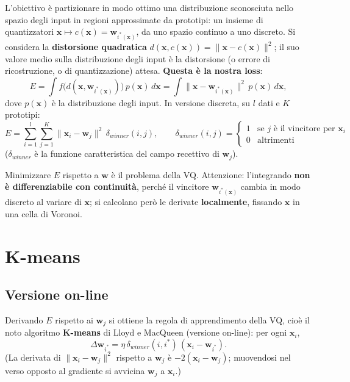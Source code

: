 L'obiettivo è partizionare in modo ottimo una distribuzione sconosciuta
nello spazio degli input in regioni approssimate da prototipi: un
insieme di quantizzatori
\(\mathbf{x} \mapsto c(\mathbf{x}) = \mathbf{w}_{i^*(\mathbf{x})}\), da
uno spazio continuo a uno discreto. Si considera la \textbf{distorsione
quadratica}
\(d(\mathbf{x}, c(\mathbf{x})) = \|\mathbf{x} - c(\mathbf{x})\|^2\); il
suo valore medio sulla distribuzione degli input è la distorsione (o
errore di ricostruzione, o di quantizzazione) attesa. \textbf{Questa è
la nostra loss}: \[
E = \int f\big(d(\mathbf{x}, \mathbf{w}_{i^*(\mathbf{x})})\big)\,p(\mathbf{x})\,d\mathbf{x} = \int \|\mathbf{x} - \mathbf{w}_{i^*(\mathbf{x})}\|^2\,p(\mathbf{x})\,d\mathbf{x},
\] dove \(p(\mathbf{x})\) è la distribuzione degli input. In versione
discreta, su \(l\) dati e \(K\) prototipi: \[
E = \sum_{i=1}^{l}\sum_{j=1}^{K}\|\mathbf{x}_i - \mathbf{w}_j\|^2\,\delta_{winner}(i, j), \qquad \delta_{winner}(i,j) = \begin{cases} 1 & \text{se } j \text{ è il vincitore per } \mathbf{x}_i \\ 0 & \text{altrimenti} \end{cases}
\] (\(\delta_{winner}\) è la funzione caratteristica del campo recettivo
di \(\mathbf{w}_j\)).

Minimizzare \(E\) rispetto a \(\mathbf{w}\) è il problema della VQ.
Attenzione: l'integrando \textbf{non è differenziabile con continuità},
perché il vincitore \(\mathbf{w}_{i^*(\mathbf{x})}\) cambia in modo
discreto al variare di \(\mathbf{x}\); si calcolano però le derivate
\textbf{localmente}, fissando \(\mathbf{x}\) in una cella di Voronoi.

\section{K-means}\label{k-means}

\subsection{Versione on-line}\label{versione-on-line}

Derivando \(E\) rispetto ai \(\mathbf{w}_j\) si ottiene la regola di
apprendimento della VQ, cioè il noto algoritmo \textbf{K-means} di Lloyd
e MacQueen (versione on-line): per ogni \(\mathbf{x}_i\), \[
\Delta\mathbf{w}_{i^*} = \eta\,\delta_{winner}(i, i^*)\,(\mathbf{x}_i - \mathbf{w}_{i^*}).
\] (La derivata di \(\|\mathbf{x}_i - \mathbf{w}_j\|^2\) rispetto a
\(\mathbf{w}_j\) è \(-2(\mathbf{x}_i - \mathbf{w}_j)\); muovendosi nel
verso opposto al gradiente si avvicina \(\mathbf{w}_j\) a
\(\mathbf{x}_i\).)

